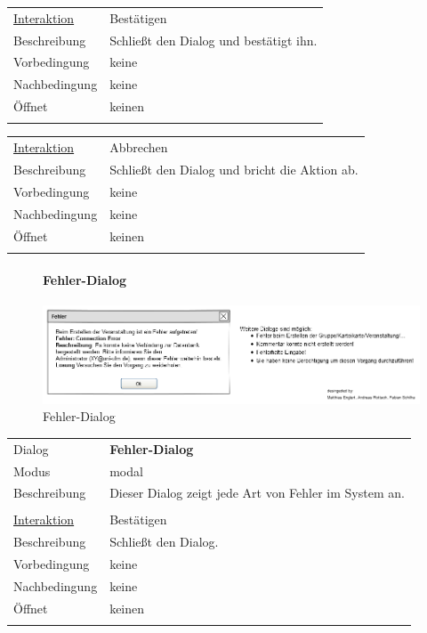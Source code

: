 \documentclass[12pt,a4paper]{article}
\begin{document}
{\begin{tabular}{l p{12cm}}
	\underline{Interaktion} 	 & Bestätigen\\ 
	Beschreibung   	& Schließt den Dialog und bestätigt ihn.\\
	Vorbedingung	& keine \\
	Nachbedingung	& keine \\
	Öffnet			& keinen\\\\
\end{tabular}

\begin{tabular}{l p{12cm}}
	\underline{Interaktion} 	 & Abbrechen\\ 
	Beschreibung   	& Schließt den Dialog und bricht die Aktion ab.\\
	Vorbedingung	& keine \\
	Nachbedingung	& keine \\
	Öffnet			& keinen\\\\
\end{tabular}

\begin{figure}[H]
	\centering
	\paragraph{Fehler-Dialog}
	\includegraphics[width=\textwidth]{Bilder/Mockups/GUI/Fehler.png}
	\caption{Fehler-Dialog}
	\label{GuiFehlerDialog}
\end{figure}
\begin{tabular}{l p{12cm}}
	Dialog 	 & \textbf{Fehler-Dialog} \\ 
	Modus & modal\\ 
	Beschreibung   	& Dieser Dialog zeigt jede Art von Fehler im System an. \\\\
	
	\underline{Interaktion} 	 & Bestätigen\\ 
	Beschreibung   	& Schließt den Dialog.\\
	Vorbedingung	& keine \\
	Nachbedingung	& keine \\
	Öffnet			& keinen\\\\
\end{tabular}


}
\end{document}
